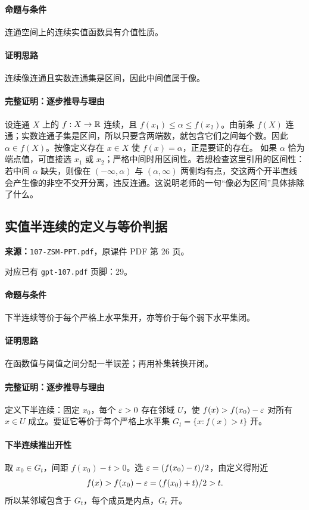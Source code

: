 \paragraph{命题与条件}连通空间上的连续实值函数具有介值性质。
\paragraph{证明思路}连续像连通且实数连通集是区间，因此中间值属于像。
\paragraph{完整证明：逐步推导与理由}

设连通 $X$ 上的 $f:X\to\mathbb{R}$ 连续，且 $f(x_1)\le\alpha\le f(x_2)$。由前条 $f(X)$ 连通；实数连通子集是区间，所以只要含两端数，就包含它们之间每个数。因此 $\alpha\in f(X)$。按像定义存在 $x\in X$ 使 $f(x)=\alpha$，正是要证的存在。
如果 $\alpha$ 恰为端点值，可直接选 $x_1$ 或 $x_2$；严格中间时用区间性。若想检查这里引用的区间性：若中间 $\alpha$ 缺失，则像在 $(-\infty,\alpha)$ 与 $(\alpha,\infty)$ 两侧均有点，交这两个开半直线会产生像的非空不交开分离，违反连通。这说明老师的一句“像必为区间”具体排除了什么。

\clearpage\subsection{实值半连续的定义与等价判据}
\textbf{来源：}\texttt{107-ZSM-PPT.pdf}，原课件 PDF 第 26 页。\par
对应已有 \texttt{gpt-107.pdf} 页脚：29。\par
\paragraph{命题与条件}下半连续等价于每个严格上水平集开，亦等价于每个弱下水平集闭。
\paragraph{证明思路}在函数值与阈值之间分配一半误差；再用补集转换开闭。
\paragraph{完整证明：逐步推导与理由}

定义下半连续：固定 $x_0$，每个 $\varepsilon>0$ 存在邻域 $U$，使 $f(x)>f(x_0)-\varepsilon$ 对所有 $x\in U$ 成立。要证它等价于每个严格上水平集 $G_t=\{x:f(x)>t\}$ 开。
\paragraph{下半连续推出开性}取 $x_0\in G_t$，间距 $f(x_0)-t>0$。选 $\varepsilon=(f(x_0)-t)/2$，由定义得附近
\[f(x)>f(x_0)-\varepsilon=(f(x_0)+t)/2>t.\]
所以某邻域包含于 $G_t$，每个成员是内点，$G_t$ 开。
